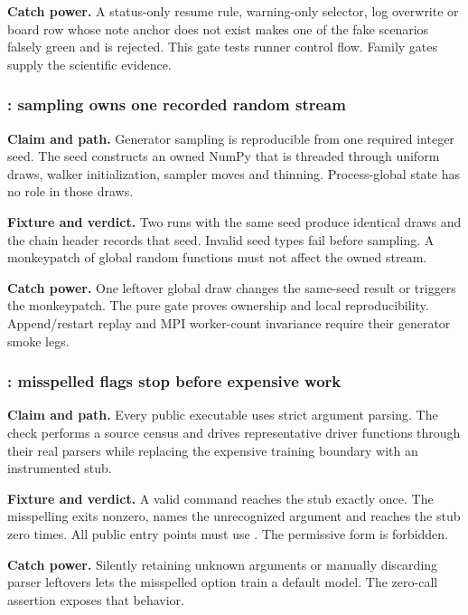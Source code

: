 \textbf{Catch power.}  A status-only resume rule, warning-only selector, log
overwrite or board row whose note anchor does not exist makes one of the
fake scenarios falsely green and is rejected.  This gate tests runner control
flow.  Family gates supply the scientific evidence.

\subsubsection{: sampling owns one recorded random stream}

\textbf{Claim and path.}  Generator sampling is reproducible from one required
integer seed.  The seed constructs an owned NumPy  that is
threaded through uniform draws, walker initialization, sampler moves and
thinning.  Process-global  state has no role in those draws.

\textbf{Fixture and verdict.}  Two runs with the same seed produce identical
draws and the chain header records that seed.  Invalid seed types fail before
sampling.  A monkeypatch of global random functions must not affect the owned
stream.

\textbf{Catch power.}  One leftover global draw changes the same-seed result
or triggers the monkeypatch.  The pure gate proves ownership and local
reproducibility.  Append/restart replay and MPI worker-count invariance require
their generator smoke legs.

\subsubsection{: misspelled flags stop before expensive work}

\textbf{Claim and path.}  Every public executable uses strict argument
parsing.  The check performs a source census and drives representative driver
 functions through their real parsers while replacing the
expensive training boundary with an instrumented stub.

\textbf{Fixture and verdict.}  A valid command reaches the stub exactly once.
The misspelling  exits nonzero, names the unrecognized
argument and reaches the stub zero times.  All public entry points must use
.  The permissive  form is forbidden.

\textbf{Catch power.}  Silently retaining unknown arguments or manually
discarding parser leftovers lets the misspelled option train a default model.
The zero-call assertion exposes that behavior.

